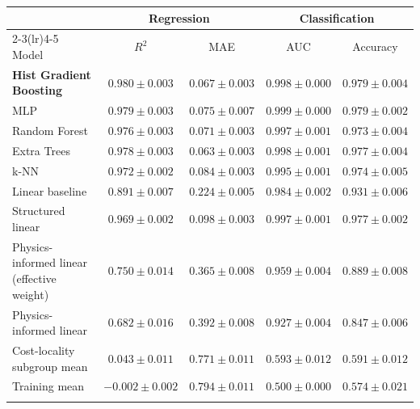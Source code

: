 \begin{tabular}{lcccc}
\toprule
 & \multicolumn{2}{c}{Regression} & \multicolumn{2}{c}{Classification} \\
\cmidrule(lr){2-3}\cmidrule(lr){4-5}
Model & $R^2$ & MAE & AUC & Accuracy \\
\midrule
\textbf{Hist Gradient Boosting} & $0.980 \pm 0.003$ & $0.067 \pm 0.003$ & $0.998 \pm 0.000$ & $0.979 \pm 0.004$ \\
MLP & $0.979 \pm 0.003$ & $0.075 \pm 0.007$ & $0.999 \pm 0.000$ & $0.979 \pm 0.002$ \\
Random Forest & $0.976 \pm 0.003$ & $0.071 \pm 0.003$ & $0.997 \pm 0.001$ & $0.973 \pm 0.004$ \\
Extra Trees & $0.978 \pm 0.003$ & $0.063 \pm 0.003$ & $0.998 \pm 0.001$ & $0.977 \pm 0.004$ \\
k-NN & $0.972 \pm 0.002$ & $0.084 \pm 0.003$ & $0.995 \pm 0.001$ & $0.974 \pm 0.005$ \\
Linear baseline & $0.891 \pm 0.007$ & $0.224 \pm 0.005$ & $0.984 \pm 0.002$ & $0.931 \pm 0.006$ \\
\midrule
Structured linear & $0.969 \pm 0.002$ & $0.098 \pm 0.003$ & $0.997 \pm 0.001$ & $0.977 \pm 0.002$ \\
Physics-informed linear (effective weight) & $0.750 \pm 0.014$ & $0.365 \pm 0.008$ & $0.959 \pm 0.004$ & $0.889 \pm 0.008$ \\
Physics-informed linear & $0.682 \pm 0.016$ & $0.392 \pm 0.008$ & $0.927 \pm 0.004$ & $0.847 \pm 0.006$ \\
Cost-locality subgroup mean & $0.043 \pm 0.011$ & $0.771 \pm 0.011$ & $0.593 \pm 0.012$ & $0.591 \pm 0.012$ \\
Training mean & $-0.002 \pm 0.002$ & $0.794 \pm 0.011$ & $0.500 \pm 0.000$ & $0.574 \pm 0.021$ \\
\botrule
\end{tabular}
